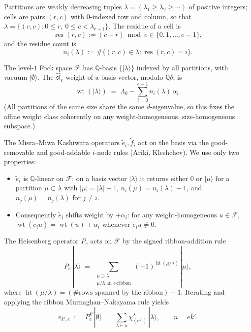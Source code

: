 \documentclass[11pt]{article}
\theoremstyle{definition}
\DeclareMathOperator{\wt}{wt}
\DeclareMathOperator{\htg}{ht}
\DeclareMathOperator{\res}{res}
\newcommand{\Fock}{\mathcal{F}}
\newcommand{\slh}{\widehat{\mathfrak{sl}}}
\newcommand{\tf}{\tilde f}
\newcommand{\te}{\tilde e}
\begin{document}
Partitions are weakly decreasing tuples $\lambda = (\lambda_1 \ge \lambda_2 \ge \cdots)$ of
positive integers; cells are pairs $(r,c)$ with $0$-indexed row and column, so that
$\lambda = \{(r,c) : 0\le r, \ 0 \le c < \lambda_{r+1}\}$. The residue of a cell is
\[
  \res(r,c) := (c-r) \bmod e \in \{0,1,\ldots,e-1\},
\]
and the residue count is
\[
  n_i(\lambda) := \#\{(r,c) \in \lambda : \res(r,c) = i\}.
\]

The level-$1$ Fock space $\Fock$ has $\mathbb{Q}$-basis $\{|\lambda\rangle\}$ indexed by all
partitions, with vacuum $|\emptyset\rangle$. The $\slh_e$-weight of a basis vector, modulo
$\mathbb{Q}\delta$, is
\begin{equation}\label{eq:weight}
  \wt(|\lambda\rangle) \;=\; \Lambda_0 - \sum_{i=0}^{e-1} n_i(\lambda)\,\alpha_i.
\end{equation}
(All partitions of the same size share the same $d$-eigenvalue, so this fixes the affine
weight class coherently on any weight-homogeneous, size-homogeneous subspace.)

The Misra--Miwa Kashiwara operators $\te_i,\tf_i$ act on the basis via the good-removable
and good-addable $i$-node rules (Ariki, Kleshchev). We use only two properties:
\begin{itemize}
  \item[(K1)] $\te_i$ is $\mathbb{Q}$-linear on $\Fock$; on a basis vector $|\lambda\rangle$
  it returns either $0$ or $|\mu\rangle$ for a partition $\mu \subset \lambda$ with $|\mu|
  = |\lambda|-1$, $n_i(\mu) = n_i(\lambda)-1$, and $n_j(\mu) = n_j(\lambda)$ for $j\ne i$.
  \item[(K2)] Consequently $\te_i$ shifts weight by $+\alpha_i$: for any
  weight-homogeneous $u\in\Fock$, $\wt(\te_i u) = \wt(u) + \alpha_i$ whenever
  $\te_i u\ne 0$.
\end{itemize}

The Heisenberg operator $P_e$ acts on $\Fock$ by the signed ribbon-addition rule
\[
  P_e\,|\lambda\rangle \;=\; \sum_{\substack{\mu \supset \lambda \\
      \mu/\lambda \text{ an } e\text{-ribbon}}}
    (-1)^{\htg(\mu/\lambda)}\,|\mu\rangle,
\]
where $\htg(\mu/\lambda) = (\text{\# rows spanned by the ribbon}) - 1$. Iterating and
applying the ribbon Murnaghan--Nakayama rule yields
\begin{equation}\label{eq:v-def}
  v_{k',e} \;:=\; P_e^{k'}|\emptyset\rangle
     \;=\; \sum_{\lambda\vdash n} \chi^\lambda_{(e^{k'})}\,|\lambda\rangle,
     \qquad n = ek'.
\end{equation}
\end{document}
